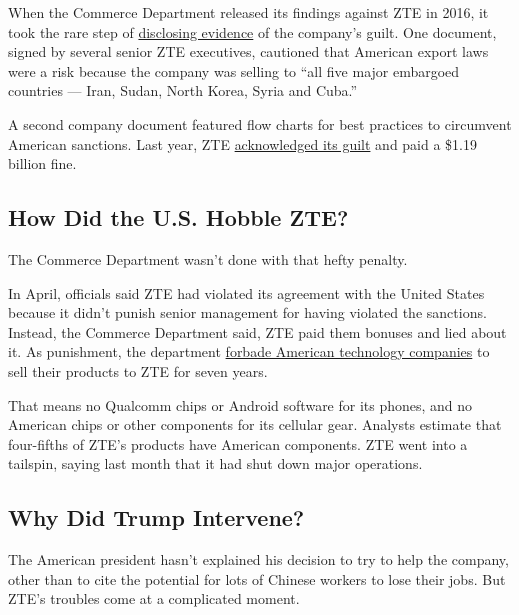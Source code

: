 When the Commerce Department released its findings against ZTE in 2016,
it took the rare step of
\href{https://www.nytimes.com/2016/03/08/technology/us-restricts-sales-to-zte-saying-it-breached-sanctions.html}{disclosing
evidence} of the company's guilt. One document, signed by several senior
ZTE executives, cautioned that American export laws were a risk because
the company was selling to ``all five major embargoed countries ---
Iran, Sudan, North Korea, Syria and Cuba.''

A second company document featured flow charts for best practices to
circumvent American sanctions. Last year, ZTE
\href{https://www.nytimes.com/2017/03/07/technology/zte-china-fine.html}{acknowledged
its guilt} and paid a \$1.19 billion fine.

\hypertarget{how-did-the-us-hobble-zte}{%
\subsection{How Did the U.S. Hobble
ZTE?}\label{how-did-the-us-hobble-zte}}

The Commerce Department wasn't done with that hefty penalty.

In April, officials said ZTE had violated its agreement with the United
States because it didn't punish senior management for having violated
the sanctions. Instead, the Commerce Department said, ZTE paid them
bonuses and lied about it. As punishment, the department
\href{https://www.nytimes.com/2018/04/16/technology/chinese-tech-company-blocked-from-buying-american-components.html}{forbade
American technology companies} to sell their products to ZTE for seven
years.

That means no Qualcomm chips or Android software for its phones, and no
American chips or other components for its cellular gear. Analysts
estimate that four-fifths of ZTE's products have American components.
ZTE went into a tailspin, saying last month that it had shut down major
operations.

\hypertarget{why-did-trump-intervene}{%
\subsection{Why Did Trump Intervene?}\label{why-did-trump-intervene}}

The American president hasn't explained his decision to try to help the
company, other than to cite the potential for lots of Chinese workers to
lose their jobs. But ZTE's troubles come at a complicated moment.


